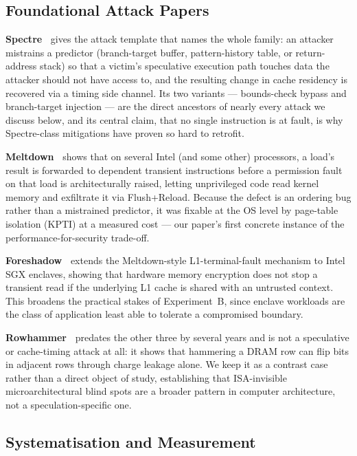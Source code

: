 \documentclass[11pt,a4paper]{article}
\begin{document}
\subsection{Foundational Attack Papers}
\label{sec:foundational}

\textbf{Spectre~\cite{kocher2019spectre}} gives the attack template that
names the whole family: an attacker mistrains a predictor (branch-target
buffer, pattern-history table, or return-address stack) so that a victim's
speculative execution path touches data the attacker should not have access
to, and the resulting change in cache residency is recovered via a timing
side channel. Its two variants --- bounds-check bypass and branch-target
injection --- are the direct ancestors of nearly every attack we discuss
below, and its central claim, that no single instruction is at fault, is why
Spectre-class mitigations have proven so hard to retrofit.

\textbf{Meltdown~\cite{lipp2018meltdown}} shows that on several Intel (and
some other) processors, a load's result is forwarded to dependent transient
instructions before a permission fault on that load is architecturally
raised, letting unprivileged code read kernel memory and exfiltrate it via
Flush+Reload. Because the defect is an ordering bug rather than a mistrained
predictor, it was fixable at the OS level by page-table isolation (KPTI) at a measured cost --- our
paper's first concrete instance of the performance-for-security trade-off.

\textbf{Foreshadow~\cite{vanbulck2018foreshadow}} extends the Meltdown-style
L1-terminal-fault mechanism to Intel SGX enclaves, showing that hardware
memory encryption does not stop a transient read if the underlying L1 cache
is shared with an untrusted context. This broadens the practical stakes of
Experiment~B, since enclave workloads are the class of application least able
to tolerate a compromised boundary.

\textbf{Rowhammer~\cite{kim2014rowhammer}} predates the other three by
several years and is not a speculative or cache-timing attack at all: it
shows that hammering a DRAM row can flip bits in adjacent rows through charge
leakage alone. We keep it as a contrast case rather than a direct object of
study, establishing that ISA-invisible microarchitectural blind spots are a
broader pattern in computer architecture, not a speculation-specific one.

\subsection{Systematisation and Measurement}
\end{document}
